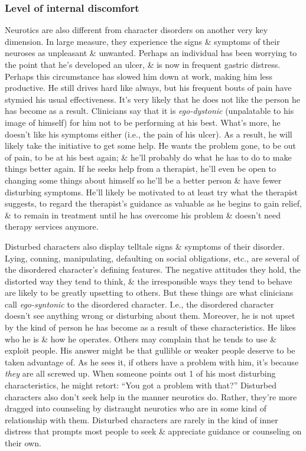 \documentclass{article}
\numberwithin{equation}{section}
\begin{document}
\subsubsection{Level of internal discomfort}
Neurotics are also different from character disorders on another very key dimension. In large measure, they experience the signs \& symptoms of their neuroses as unpleasant \& unwanted. Perhaps an individual has been worrying to the point that he's developed an ulcer, \& is now in frequent gastric distress. Perhaps this circumstance has slowed him down at work, making him less productive. He still drives hard like always, but his frequent bouts of pain have stymied his usual effectiveness. It's very likely that he does not like the person he has become as a result. Clinicians say that it is \textit{ego-dystonic} (unpalatable to his image of himself) for him not to be performing at his best. What's more, he doesn't like his symptoms either (i.e., the pain of his ulcer). As a result, he will likely take the initiative to get some help. He wants the problem gone, to be out of pain, to be at his best again; \& he'll probably do what he has to do to make things better again. If he seeks help from a therapist, he'll even be open to changing some things about himself so he'll be a better person \& have fewer disturbing symptoms. He'll likely be motivated to at least try what the therapist suggests, to regard the therapist's guidance as valuable as he begins to gain relief, \& to remain in treatment until he has overcome his problem \& doesn't need therapy services anymore.

Disturbed characters also display telltale signs \& symptoms of their disorder. Lying, conning, manipulating, defaulting on social obligations, etc., are several of the disordered character's defining features. The negative attitudes they hold, the distorted way they tend to think, \& the irresponsible ways they tend to behave are likely to be greatly upsetting to others. But these things are what clinicians call \textit{ego-syntonic} to the disordered character. I.e., the disordered character doesn't see anything wrong or disturbing about them. Moreover, he is not upset by the kind of person he has become as a result of these characteristics. He likes who he is \& how he operates. Others may complain that he tends to use \& exploit people. His answer might be that gullible or weaker people deserve to be taken advantage of. As he sees it, if others have a problem with him, it's because \textit{they} are all screwed up. When someone points out 1 of his most disturbing characteristics, he might retort: ``You got a problem with that?'' Disturbed characters also don't seek help in the manner neurotics do. Rather, they're more dragged into counseling by distraught neurotics who are in some kind of relationship with them. Disturbed characters are rarely in the kind of inner distress that prompts most people to seek \& appreciate guidance or counseling on their own.
\end{document}
